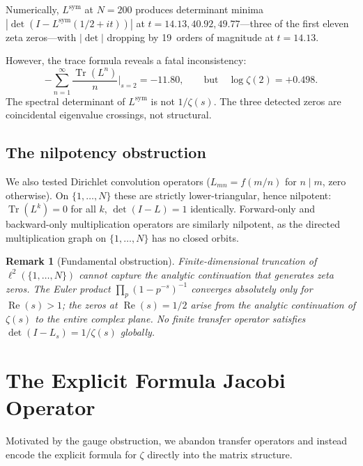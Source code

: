 \documentclass[11pt,a4paper]{article}
\newtheorem{remark}[theorem]{Remark}
\DeclareMathOperator{\Tr}{Tr}
\begin{document}
Numerically, $L^{\mathrm{sym}}$ at $N = 200$ produces determinant minima $|\!\det(I - L^{\mathrm{sym}}(1/2 + it))|$ at $t = 14.13, 40.92, 49.77$---three of the first eleven zeta zeros---with $|\!\det|$ dropping by 19~orders of magnitude at $t = 14.13$.

However, the trace formula reveals a fatal inconsistency:
\begin{equation}
-\sum_{n=1}^{\infty} \frac{\Tr(L^n)}{n}\biggr|_{s=2} = -11.80, \qquad \text{but} \quad \log\zeta(2) = +0.498.
\end{equation}
The spectral determinant of $L^{\mathrm{sym}}$ is not $1/\zeta(s)$.
The three detected zeros are coincidental eigenvalue crossings, not structural.

\subsection{The nilpotency obstruction}

We also tested Dirichlet convolution operators ($L_{mn} = f(m/n)$ for $n \mid m$, zero otherwise).
On $\{1,\ldots,N\}$ these are strictly lower-triangular, hence nilpotent: $\Tr(L^k) = 0$ for all $k$, $\det(I - L) = 1$ identically.
Forward-only and backward-only multiplication operators are similarly nilpotent, as the directed multiplication graph on $\{1,\ldots,N\}$ has no closed orbits.

\begin{remark}[Fundamental obstruction]
Finite-dimensional truncation of $\ell^2(\{1,\ldots,N\})$ cannot capture the analytic continuation that generates zeta zeros.
The Euler product $\prod_p (1 - p^{-s})^{-1}$ converges absolutely only for $\operatorname{Re}(s) > 1$; the zeros at $\operatorname{Re}(s) = 1/2$ arise from the analytic continuation of $\zeta(s)$ to the entire complex plane.
No finite transfer operator satisfies $\det(I - L_s) = 1/\zeta(s)$ globally.
\end{remark}

\section{The Explicit Formula Jacobi Operator}\label{sec:explicit}

Motivated by the gauge obstruction, we abandon transfer operators and instead encode the explicit formula for $\zeta$ directly into the matrix structure.
\end{document}

